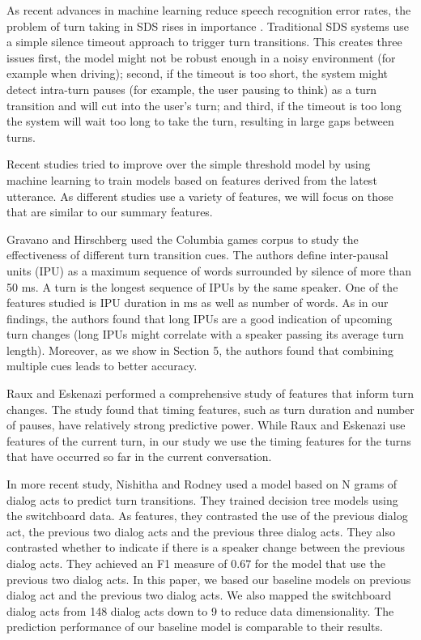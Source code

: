 
As recent advances in machine learning reduce speech recognition error rates, the problem of turn taking in SDS rises in importance \cite{hinton2012deep}. Traditional SDS systems use a simple silence timeout approach to trigger turn transitions. This creates three issues \cite{arsikere2015enhanced} first, the model might not be robust enough
in a noisy environment (for example when driving); second, if the timeout is too short, the system might
detect intra-turn pauses (for example, the user pausing to think) as a turn transition and will cut into the user's turn;
and third, if the timeout is too long the system will wait too long to take the turn, resulting in large gaps between turns.

Recent studies tried to improve over the simple threshold model by using machine learning to train models based on features derived from the latest utterance. As different studies use a variety of features, we will focus on those that are similar to our summary features.

Gravano and Hirschberg \cite{gravano2011turn} used the Columbia games corpus to study the effectiveness of
different turn transition cues. The authors define inter-pausal units (IPU) as a maximum sequence of words surrounded by silence of more than 50 ms. A turn is the longest sequence of IPUs by the same speaker.
One of the features studied is IPU duration in ms as well as number of words. As in our findings,
the authors found that long IPUs are a good indication of upcoming turn changes (long IPUs might correlate with a speaker passing its average turn length). Moreover, as we show in Section 5, the authors found that combining multiple cues leads to better accuracy.

Raux and Eskenazi \cite{raux2012optimizing} performed a comprehensive study of features that inform turn changes. The study
found that timing features, such as turn duration and number of pauses, have relatively strong predictive power. While Raux and Eskenazi use features of the current turn, in our study we use the timing features for the turns that have occurred so far in the current conversation.

In more recent study, Nishitha and Rodney \cite{SSS1510313} used a model based on N grams of dialog acts to predict turn transitions.
They trained decision tree models using the switchboard data. As features, they contrasted the use of the previous dialog act, the previous two dialog acts and the previous three dialog acts. They also contrasted whether to indicate if there is a speaker change between the previous dialog acts. They achieved an F1 measure of $0.67$ for the model that use the previous two dialog acts.
%
In this paper, we based our baseline models on previous dialog act and the previous two dialog acts. We also mapped the switchboard dialog acts from 148 dialog acts down to 9 to reduce data dimensionality. The prediction performance of our baseline model is comparable to their results.


